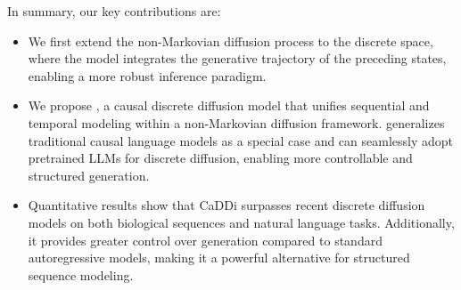In summary, our key contributions are:
\begin{itemize}
    \item We first extend the non-Markovian diffusion process to the discrete space, where the model integrates the generative trajectory of the preceding states, enabling a more robust inference paradigm.

    \item We propose \method{}, a causal discrete diffusion model that unifies sequential and temporal modeling within a non-Markovian diffusion framework. \method{} generalizes traditional causal language models as a special case and can seamlessly adopt pretrained LLMs for discrete diffusion, enabling more controllable and structured generation.

    
    \item Quantitative results show that CaDDi surpasses recent discrete diffusion models on both biological sequences and natural language tasks. Additionally, it provides greater control over generation compared to standard autoregressive models, making it a powerful alternative for structured sequence modeling.
    
\end{itemize}





